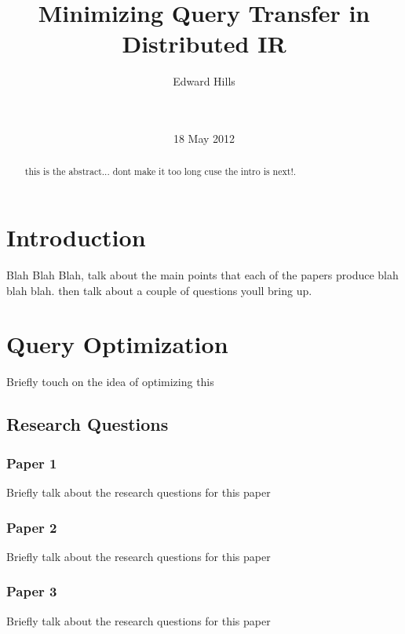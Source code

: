\documentclass{acm_proc_article-sp}
\begin{document}
\title{Minimizing Query Transfer in Distributed IR}

\author{
\alignauthor
Edward Hills\\\\
       \\
       }
\date{18 May 2012}

\maketitle
\begin{abstract}
this is the abstract... dont make it too long cuse the intro is next!.
\end{abstract}

\section{Introduction}

Blah Blah Blah, talk about the main points that each of the papers produce blah blah blah. then talk about a couple of questions youll bring up.

\section{Query Optimization}

Briefly touch on the idea of optimizing this

\subsection{Research Questions}
\subsubsection{Paper 1}
Briefly talk about the research questions for this paper

\subsubsection{Paper 2}
Briefly talk about the research questions for this paper

\subsubsection{Paper 3}
Briefly talk about the research questions for this paper
\end{document}

